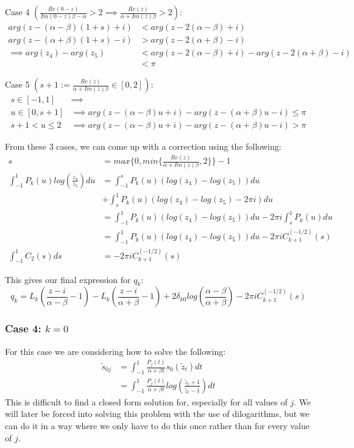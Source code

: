 \documentclass{article}
\begin{document}
Case 4 $(\frac{Re(0-z)}{Im(0-z)\beta-\alpha}>2\implies\frac{Re(z)}{\alpha+Im(z)\beta}>2)$:
\begin{align}
    arg(z-(\alpha-\beta)(1+s)+i)&<arg(z-2(\alpha-\beta)+i)\\
    arg(z-(\alpha+\beta)(1+s)-i)&>arg(z-2(\alpha+\beta)-i)\\
    \implies arg(z_4)-arg(z_5)&<arg(z-2(\alpha-\beta)+i)-arg(z-2(\alpha+\beta)-i)\\
    &<\pi
\end{align}

Case 5 $(s+1:=\frac{Re(z)}{\alpha+Im(z)\beta}\in[0,2])$:
\begin{align}
    s\in[-1,1] &\implies\\
    u\in[0,s+1] &\implies arg(z-(\alpha-\beta)u+i)-arg(z-(\alpha+\beta)u-i)\leq\pi\\
    s+1<u\leq2 &\implies arg(z-(\alpha-\beta)u+i)-arg(z-(\alpha+\beta)u-i)>\pi
\end{align}

From these 3 cases, we can come up with a correction using the following:
\begin{align}
    s &= max\{0, min\{\frac{Re(z)}{\alpha+Im(z)\beta},2\}\}-1\\
    \int_{-1}^1P_k(u)log(\frac{z_4}{z_5})du &=\int_{-1}^sP_k(u)(log(z_4)-log(z_5))du\\
    &+\int_s^1P_k(u)(log(z_4)-log(z_5)-2\pi i)du\\
    &=\int_{-1}^1P_k(u)(log(z_4)-log(z_5))du-2\pi i\int_s^1P_k(u)du\\
    &=\int_{-1}^1P_k(u)(log(z_4)-log(z_5))du-2\pi iC_{k+1}^{(-1/2)}(s)\\
    \int_{-1}^1C_2(s)ds &= -2\pi iC_{k+1}^{(-1/2)}(s)
\end{align}

This gives our final expression for $q_k$:
$$q_k=L_k(\frac{z-i}{\alpha-\beta}-1)-L_k(\frac{z-i}{\alpha+\beta}-1)
+2\delta_{k0}log(\frac{\alpha-\beta}{\alpha+\beta})-2\pi i C_{k+1}^{(-1/2)}(s)$$

\subsubsection{Case 4: $k=0$}
For this case we are considering how to solve the following:
\begin{align}
    \tilde{s}_{0j} &= \int_{-1}^1\frac{P_j(t)}{\alpha+\beta t}s_0(\tilde{z}_t)dt\\
    &= \int_{-1}^1\frac{P_j(t)}{\alpha+\beta t}log(\frac{\tilde{z}_t+1}{\tilde{z}_t-1})dt
\end{align}
This is difficult to find a closed form solution for, especially for all values of $j$.
We will later be forced into solving this problem with the use of dilogarithms, but we can do it in a way where we only have to do this once rather than for every value of $j$.
\end{document}
